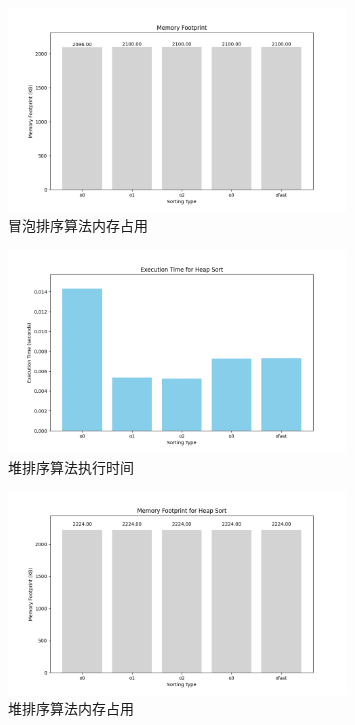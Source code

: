 \documentclass[UTF8]{ctexart}
\begin{document}
\begin{figure}[H]
    \centering
    \includegraphics[width=0.8\textwidth]{picture/Figure_2.png}
    \caption{冒泡排序算法内存占用}
\end{figure}

\begin{figure}[H]
    \centering
    \includegraphics[width=0.8\textwidth]{picture/Figure_3.png}
    \caption{堆排序算法执行时间}
\end{figure}

\begin{figure}[H]
    \centering
    \includegraphics[width=0.8\textwidth]{picture/Figure_4.png}
    \caption{堆排序算法内存占用}
\end{figure}
\end{document}

